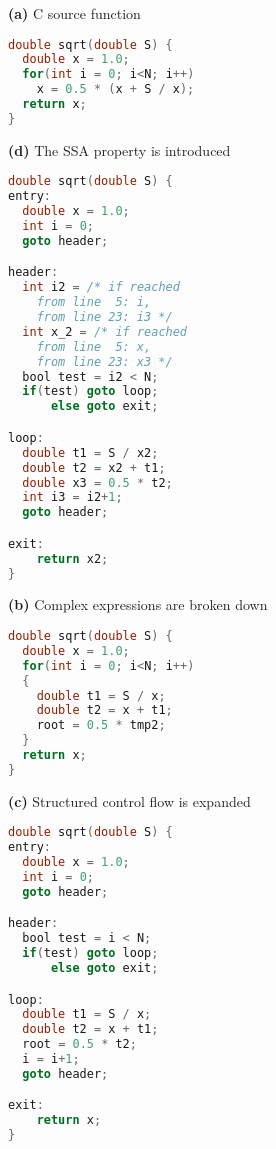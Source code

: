     \begin{minipage}{0.48\textwidth}
    {\bf(a)} {} C source function
    \begin{lstlisting}[language=C]
double sqrt(double S) {
  double x = 1.0;
  for(int i = 0; i<N; i++)
    x = 0.5 * (x + S / x);
  return x;
}
    \end{lstlisting}

    \vspace{1em}
    {\bf(d)} {} The SSA property is introduced
    \begin{lstlisting}[language=C]
double sqrt(double S) {
entry:
  double x = 1.0;
  int i = 0;
  goto header;

header:
  int i2 = /* if reached
    from line  5: i,
    from line 23: i3 */
  int x_2 = /* if reached
    from line  5: x,
    from line 23: x3 */
  bool test = i2 < N;
  if(test) goto loop;
      else goto exit;

loop:
  double t1 = S / x2;
  double t2 = x2 + t1;
  double x3 = 0.5 * t2;
  int i3 = i2+1;
  goto header;

exit:
    return x2;
}
    \end{lstlisting}
    \end{minipage}
    \hfill
    \begin{minipage}{0.48\textwidth}
    {\bf(b)} {} Complex expressions are broken down
    \begin{lstlisting}[language=C,basicstyle=\linespread{1.06451612903}\ttfamily]
double sqrt(double S) {
  double x = 1.0;
  for(int i = 0; i<N; i++)
  {
    double t1 = S / x;
    double t2 = x + t1;
    root = 0.5 * tmp2;
  }
  return x;
}
    \end{lstlisting}

    \vspace{1em}
    {\bf(c)} {} Structured control flow is expanded
    \begin{lstlisting}[language=C,basicstyle=\linespread{1.06451612903}\ttfamily]
double sqrt(double S) {
entry:
  double x = 1.0;
  int i = 0;
  goto header;

header:
  bool test = i < N;
  if(test) goto loop;
      else goto exit;

loop:
  double t1 = S / x;
  double t2 = x + t1;
  root = 0.5 * t2;
  i = i+1;
  goto header;

exit:
    return x;
}
    \end{lstlisting}
    \end{minipage}
